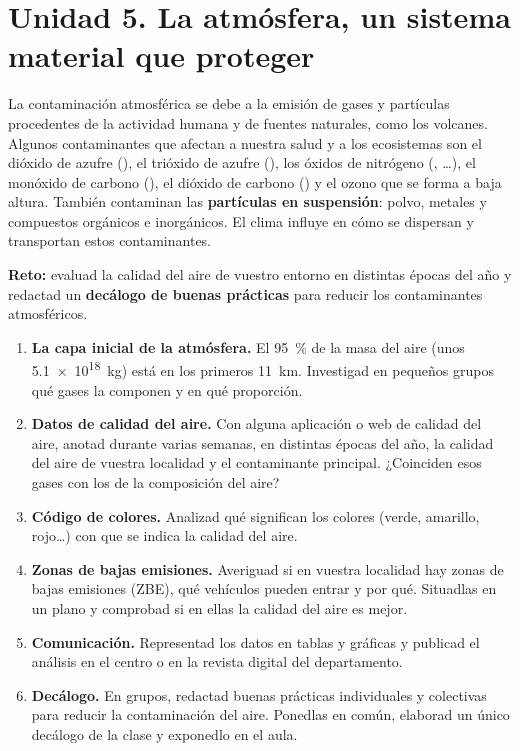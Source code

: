 \section{Unidad 5. La atmósfera, un sistema material que proteger}

La contaminación atmosférica se debe a la emisión de gases y partículas procedentes de la actividad humana y de fuentes naturales, como los volcanes. Algunos contaminantes que afectan a nuestra salud y a los ecosistemas son el dióxido de azufre (), el trióxido de azufre (), los óxidos de nitrógeno (, \ldots), el monóxido de carbono (), el dióxido de carbono () y el ozono que se forma a baja altura. También contaminan las \textbf{partículas en suspensión}: polvo, metales y compuestos orgánicos e inorgánicos. El clima influye en cómo se dispersan y transportan estos contaminantes.

\begin{marker}
    \textbf{Reto:} evaluad la calidad del aire de vuestro entorno en distintas épocas del año y redactad un \textbf{decálogo de buenas prácticas} para reducir los contaminantes atmosféricos.
\end{marker}

\begin{enumerate}[label=\numberballred]
    \item \textbf{La capa inicial de la atmósfera.} El \qty{95}{\percent} de la masa del aire (unos \qty{5.1e18}{\kg}) está en los primeros \qty{11}{\km}. Investigad en pequeños grupos qué gases la componen y en qué proporción.
    \item \textbf{Datos de calidad del aire.} Con alguna aplicación o web de calidad del aire, anotad durante varias semanas, en distintas épocas del año, la calidad del aire de vuestra localidad y el contaminante principal. ¿Coinciden esos gases con los de la composición del aire?
    \item \textbf{Código de colores.} Analizad qué significan los colores (verde, amarillo, rojo\ldots) con que se indica la calidad del aire.
    \item \textbf{Zonas de bajas emisiones.} Averiguad si en vuestra localidad hay zonas de bajas emisiones (ZBE), qué vehículos pueden entrar y por qué. Situadlas en un plano y comprobad si en ellas la calidad del aire es mejor.
    \item \textbf{Comunicación.} Representad los datos en tablas y gráficas y publicad el análisis en el centro o en la revista digital del departamento.
    \item \textbf{Decálogo.} En grupos, redactad buenas prácticas individuales y colectivas para reducir la contaminación del aire. Ponedlas en común, elaborad un único decálogo de la clase y exponedlo en el aula.
\end{enumerate}

